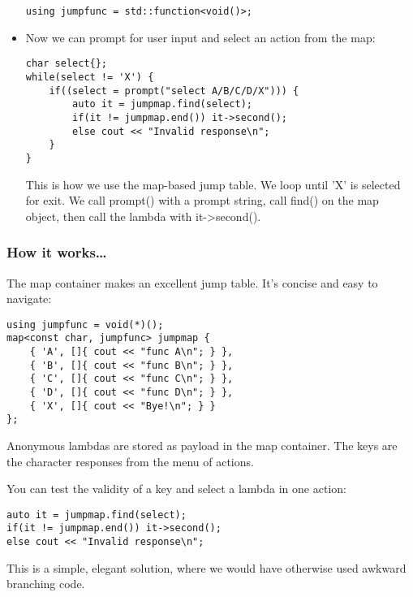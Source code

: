 \begin{itemize}
\begin{lstlisting}[style=styleCXX]
using jumpfunc = std::function<void()>;
\end{lstlisting}

\item 
Now we can prompt for user input and select an action from the map:

\begin{lstlisting}[style=styleCXX]
char select{};
while(select != 'X') {
	if((select = prompt("select A/B/C/D/X"))) {
		auto it = jumpmap.find(select);
		if(it != jumpmap.end()) it->second();
		else cout << "Invalid response\n";
	}
}
\end{lstlisting}

This is how we use the map-based jump table. We loop until 'X' is selected for exit. We call prompt() with a prompt string, call find() on the map object, then call the lambda with it->second().
\end{itemize}


\subsubsection{How it works…}

The map container makes an excellent jump table. It's concise and easy to navigate:

\begin{lstlisting}[style=styleCXX]
using jumpfunc = void(*)();
map<const char, jumpfunc> jumpmap {
	{ 'A', []{ cout << "func A\n"; } },
	{ 'B', []{ cout << "func B\n"; } },
	{ 'C', []{ cout << "func C\n"; } },
	{ 'D', []{ cout << "func D\n"; } },
	{ 'X', []{ cout << "Bye!\n"; } }
};
\end{lstlisting}

Anonymous lambdas are stored as payload in the map container. The keys are the character responses from the menu of actions.

You can test the validity of a key and select a lambda in one action:

\begin{lstlisting}[style=styleCXX]
auto it = jumpmap.find(select);
if(it != jumpmap.end()) it->second();
else cout << "Invalid response\n";
\end{lstlisting}

This is a simple, elegant solution, where we would have otherwise used awkward branching code.









